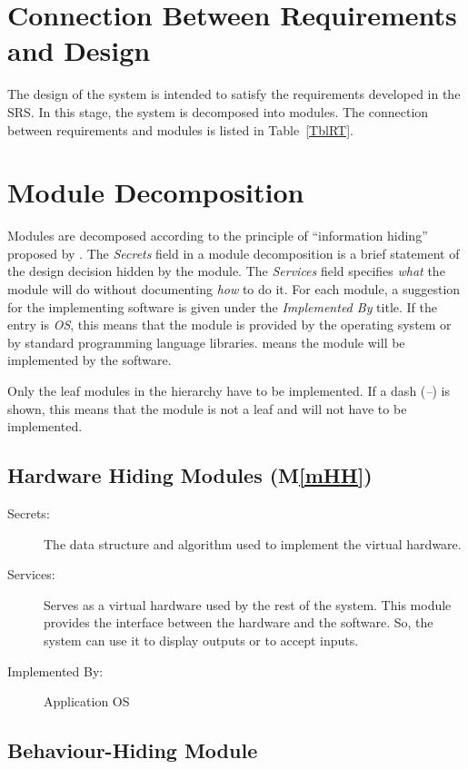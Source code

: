 \documentclass[12pt, titlepage]{article}
\newcommand{\mref}[1]{M\ref{#1}}
\begin{document}
\section{Connection Between Requirements and Design} \label{SecConnection}

The design of the system is intended to satisfy the requirements developed in
the SRS. In this stage, the system is decomposed into modules. The connection
between requirements and modules is listed in Table~\ref{TblRT}.

\section{Module Decomposition} \label{SecMD}

Modules are decomposed according to the principle of ``information hiding''
proposed by \citet{ParnasEtAl1984}. The \emph{Secrets} field in a module
decomposition is a brief statement of the design decision hidden by the
module. The \emph{Services} field specifies \emph{what} the module will do
without documenting \emph{how} to do it. For each module, a suggestion for the
implementing software is given under the \emph{Implemented By} title. If the
entry is \emph{OS}, this means that the module is provided by the operating
system or by standard programming language libraries.  \emph{\progname{}} means the
module will be implemented by the \progname{} software.

Only the leaf modules in the hierarchy have to be implemented. If a dash
(\emph{--}) is shown, this means that the module is not a leaf and will not have
to be implemented.

\subsection{Hardware Hiding Modules (\mref{mHH})}

\begin{description}
\item[Secrets:]The data structure and algorithm used to implement the virtual
  hardware.
\item[Services:]Serves as a virtual hardware used by the rest of the
  system. This module provides the interface between the hardware and the
  software. So, the system can use it to display outputs or to accept inputs.
\item[Implemented By:] Application OS
\end{description}

\subsection{Behaviour-Hiding Module}
\end{document}
